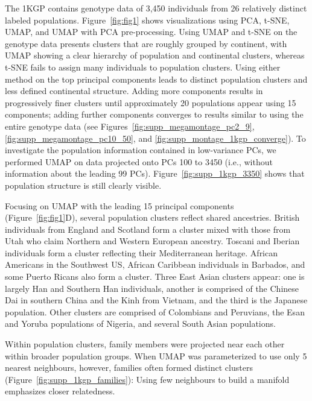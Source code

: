 The 1KGP contains genotype data of 3,450 individuals from 26 relatively distinct labeled populations\citep{10002015global}. Figure~\ref{fig:fig1} shows visualizations using PCA, t-SNE, UMAP, and UMAP with PCA pre-processing. Using UMAP and t-SNE on the genotype data presents clusters that are roughly grouped by continent, with UMAP showing a clear hierarchy of population and continental clusters, whereas t-SNE fails to assign many individuals to population clusters. Using either method on the top principal components leads to distinct population clusters and less defined continental structure. Adding more components results in progressively finer clusters until approximately 20 populations appear using 15 components; adding further components converges to results similar to using the entire genotype data (see Figures~\ref{fig:supp_megamontage_pc2_9}, \ref{fig:supp_megamontage_pc10_50}, and \ref{fig:supp_montage_1kgp_converge}). To investigate the population information contained in low-variance PCs, we performed UMAP on data projected onto PCs 100 to 3450 (i.e., without information about the leading 99 PCs). Figure~\ref{fig:supp_1kgp_3350} shows that population structure is still clearly visible.

Focusing on UMAP with the leading 15 principal components (Figure~\ref{fig:fig1}D), several population clusters reflect shared ancestries. British individuals from England and Scotland form a cluster mixed with those from Utah who claim Northern and Western European ancestry. Toscani and Iberian individuals form a cluster reflecting their Mediterranean heritage. African Americans in the Southwest US, African Caribbean individuals in Barbados, and some Puerto Ricans also form a cluster. Three East Asian clusters appear: one is largely Han and Southern Han individuals, another is comprised of the Chinese Dai in southern China and the Kinh from Vietnam, and the third is the Japanese population. Other clusters are comprised of Colombians and Peruvians, the Esan and Yoruba populations of Nigeria, and several South Asian populations. 

Within population clusters, family members were projected near each other within broader population groups. When UMAP was parameterized to use only 5 nearest neighbours, however, families often formed distinct clusters (Figure~\ref{fig:supp_1kgp_families}): Using few neighbours to build a manifold emphasizes closer relatedness.

